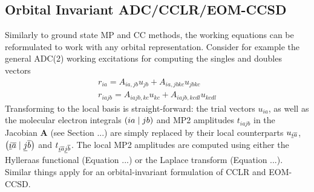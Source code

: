 \subsection{Orbital Invariant ADC/CCLR/EOM-CCSD}

Similarly to ground state MP and CC methods, the working equations can be reformulated to work with any orbital representation. Consider for example the general ADC(2) working excitations for computing the singles and doubles vectors
\begin{equation}
\begin{split}
r_{ia} = A_{ia,jb} u_{jb} + A_{ia,jbkc} u_{jbkc} \\
r_{iajb} = A_{iajb,kc} u_{kc} + A_{iajb,kcdl} u_{kcdl}
\end{split}
\end{equation}
\noindent Transforming to the local basis is straight-forward: the trial vectors $u_{ia}$, as well as the molecular electron integrals $\left( ia \mid jb \right)$ and MP2 amplitudes $t_{iajb}$ in the Jacobian $\mathbf{A}$ (see Section ...) are simply replaced by their local counterparts $u_{\underline{i}\overline{a}}$, $\left( \underline{i}\overline{a} \mid \underline{j}\overline{b} \right)$ and $t_{\underline{i}\overline{a}\underline{j}\overline{b}}$. The local MP2 amplitudes are computed using either the Hylleraas functional (Equation ...) or the Laplace transform (Equation ...). Similar things apply for an orbital-invariant formulation of CCLR and EOM-CCSD. 

